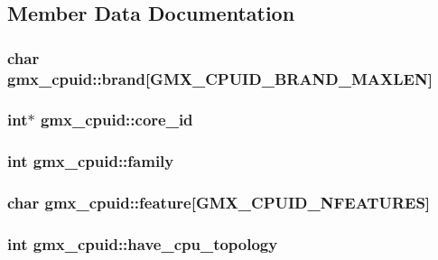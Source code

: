 \subsection{\-Member \-Data \-Documentation}
\hypertarget{structgmx__cpuid_ab110b169daeba53c26e186366b33fadf}{
\subsubsection[{brand}]{\setlength{\rightskip}{0pt plus 5cm}char {\bf gmx\-\_\-cpuid\-::brand}\mbox{[}{\bf \-G\-M\-X\-\_\-\-C\-P\-U\-I\-D\-\_\-\-B\-R\-A\-N\-D\-\_\-\-M\-A\-X\-L\-E\-N}\mbox{]}}}\label{structgmx__cpuid_ab110b169daeba53c26e186366b33fadf}
\hypertarget{structgmx__cpuid_a2ef87d5793f6687739852b0a3203fbb1}{
\subsubsection[{core\-\_\-id}]{\setlength{\rightskip}{0pt plus 5cm}int$\ast$ {\bf gmx\-\_\-cpuid\-::core\-\_\-id}}}\label{structgmx__cpuid_a2ef87d5793f6687739852b0a3203fbb1}
\hypertarget{structgmx__cpuid_ac0be9298142da8b56b41ed4f2252e3d0}{
\subsubsection[{family}]{\setlength{\rightskip}{0pt plus 5cm}int {\bf gmx\-\_\-cpuid\-::family}}}\label{structgmx__cpuid_ac0be9298142da8b56b41ed4f2252e3d0}
\hypertarget{structgmx__cpuid_a730ac422d394482fe70c57e1dab7684e}{
\subsubsection[{feature}]{\setlength{\rightskip}{0pt plus 5cm}char {\bf gmx\-\_\-cpuid\-::feature}\mbox{[}{\bf \-G\-M\-X\-\_\-\-C\-P\-U\-I\-D\-\_\-\-N\-F\-E\-A\-T\-U\-R\-E\-S}\mbox{]}}}\label{structgmx__cpuid_a730ac422d394482fe70c57e1dab7684e}
\hypertarget{structgmx__cpuid_a8b41e628c279169c44b6089e1eee2559}{
\subsubsection[{have\-\_\-cpu\-\_\-topology}]{\setlength{\rightskip}{0pt plus 5cm}int {\bf gmx\-\_\-cpuid\-::have\-\_\-cpu\-\_\-topology}}}\label{structgmx__cpuid_a8b41e628c279169c44b6089e1eee2559}

